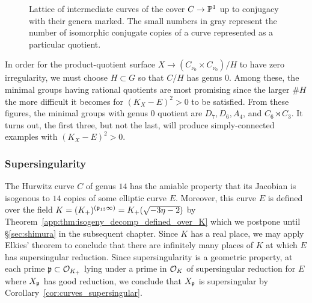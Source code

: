 \documentclass[main.tex]{subfiles}
\begin{document}
\begin{figure}
{}
    \caption{Lattice of intermediate curves of the cover $C \to \P^1$ up to conjugacy with their genera marked. The small numbers in gray represent the number of isomorphic conjugate copies of a curve represented as a particular quotient.}
    \label{fig:subgroups_genera}
\end{figure}

In order for the product-quotient surface $X \to (C_{\nu_0} \times C_{\nu_0})/H$ to have zero irregularity, we must choose $H \subset G$ so that $C / H$ has genus $0$. Among these, the minimal groups having rational quotients are most promising since the larger $\# H$ the more difficult it becomes for $(K_X - E)^2 > 0$ to be satisfied. From these figures, the minimal groups with genus $0$ quotient are $D_7, D_6, A_4$, and $C_6 \rtimes C_3$. It turns out, the first three, but not the last, will produce simply-connected examples with $(K_X - E)^2 > 0$.

\subsubsection{Supersingularity} 

The Hurwitz curve $C$ of genus $14$ has the amiable property that its Jacobian is isogenous to $14$ copies of some elliptic curve $E$. Moreover, this curve $E$ is defined over the field $K = (K_+)^{(\p_{13} \infty)} = K_+(\sqrt{-3 \eta - 2})$ by Theorem~\ref{app:thm:isogeny_decomp_defined_over_K} which we postpone until \S\ref{sec:shimura} in the subsequent chapter. Since $K$ has a real place, we may apply Elkies' theorem \cite{elkies:supersingular} to conclude that there are infinitely many places of $K$ at which $E$ has supersingular reduction. Since supersingularity is a geometric property, at each prime $\p \subset \cO_{K_+}$ lying under a prime in $\cO_K$ of supersingular reduction for $E$ where $X_{\p}$ has good reduction, we conclude that $X_{\p}$ is supersingular by Corollary~\ref{cor:curves_supersingular}.  
\end{document}
